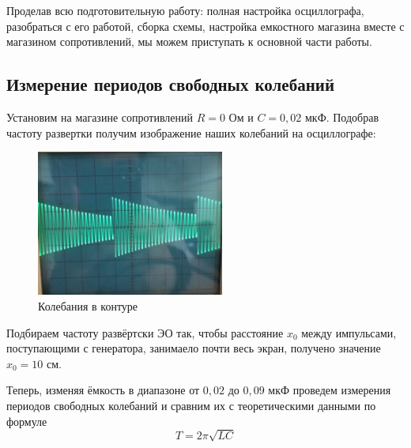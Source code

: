 \documentclass[a4paper, 12pt]{article}%
\begin{document}
Проделав всю подготовительную работу: полная настройка осциллографа, разобраться с его работой, сборка схемы, настройка емкостного магазина вместе с магазином сопротивлений, мы можем приступать к основной части работы.

\subsection{Измерение периодов свободных колебаний}

Установим на магазине сопротивлений $R = 0$ Ом и $C = 0,02$ мкФ. Подобрав частоту развертки получим изображение наших колебаний на осциллографе:

\begin{figure}[h!]
\begin{center}
\includegraphics[width = 0.55\textwidth]{part1_1.jpg}
\caption{Колебания в контуре}
\end{center}
\end{figure}

Подбираем частоту развёртски ЭО так, чтобы расстояние $x_0$ между импульсами, поступающими с генератора, занимаело почти весь экран, получено значение $x_0 = 10$ см. 

Теперь, изменяя ёмкость в диапазоне от $0,02$ до $0,09$ мкФ проведем измерения периодов свободных колебаний и сравним их с теоретическими данными по формуле 
\[T = 2 \pi \sqrt{LC}\]
\end{document}
